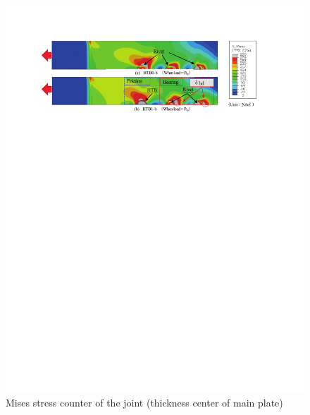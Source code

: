 \begin{figure}[htbp]
    \centering
    \begin{minipage}[t]{1\textwidth}
    \includegraphics{imgs/ch4/ch4fig9.pdf}
    \caption{Mises stress counter of the joint (thickness center of main plate)}
    \label{fig-9-ch4}
    \end{minipage}
    \begin{minipage}[t]{1\textwidth}

\end{minipage}
\end{figure}
